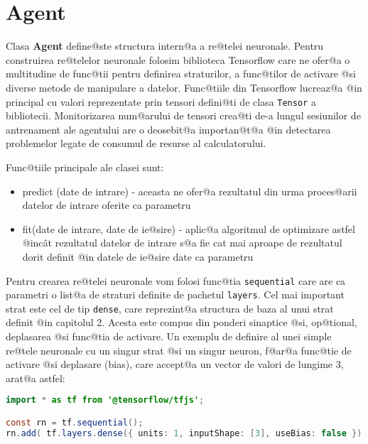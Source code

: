 \section{Agent}
 
Clasa \textbf{Agent} define@ste structura intern@a a re@telei neuronale. Pentru construirea re@telelor neuronale folosim biblioteca Tensorflow care ne ofer@a o multitudine de func@tii pentru definirea straturilor, a func@tilor de activare @si diverse metode de manipulare a datelor. Func@tiile din Tensorflow lucreaz@a @in principal cu valori reprezentate prin tensori defini@ti de clasa \texttt{Tensor} a bibliotecii. Monitorizarea num@arului de tensori crea@ti de-a lungul se\-si\-u\-ni\-lor de antrenament ale agentului are o deosebit@a importan@t@a @in detectarea problemelor legate de consumul de resurse al calculatorului.

Func@tiile principale ale clasei sunt:
\begin{itemize}
	\item predict (date de intrare) - aceasta ne ofer@a rezultatul din urma proces@arii datelor de intrare oferite ca parametru
	\item fit(date de intrare, date de ie@sire) - aplic@a algoritmul de optimizare astfel @inc\^ at rezultatul datelor de intrare s@a fie cat mai aproape de rezultatul dorit definit @in datele de ie@sire date ca parametru
\end{itemize}

Pentru crearea re@telei neuronale vom folosi func@tia \texttt{sequential} care are ca parametri o list@a de straturi definite de pachetul \texttt{layers}. Cel mai important strat este cel de tip \texttt{dense}, care reprezint@a structura de baza al unui strat definit @in capitolul 2. Acesta este compus din ponderi sinaptice @si, op@tional, deplasarea @si func@tia de activare. Un exemplu de definire al unei simple re@tele neuronale cu un singur strat @si un singur neuron, f@ar@a func@tie de activare @si deplasare (bias), care accept@a un vector de valori de lungime 3, arat@a astfel:

\begin{lstlisting}[language=Java, caption={Exemplu de creare a unei rețele neuronale simple}]
import * as tf from '@tensorflow/tfjs';

const rn = tf.sequential();
rn.add( tf.layers.dense({ units: 1, inputShape: [3], useBias: false }) );
\end{lstlisting}

